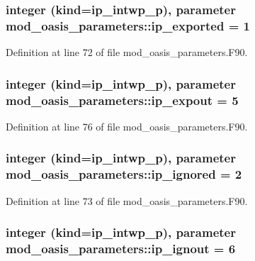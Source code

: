\hypertarget{classmod__oasis__parameters_a0f729cda95773cdc8df800eacdceb606}{
\subsubsection[{ip\+\_\+exported}]{\setlength{\rightskip}{0pt plus 5cm}integer (kind=ip\+\_\+intwp\+\_\+p), parameter mod\+\_\+oasis\+\_\+parameters\+::ip\+\_\+exported = 1}}\label{classmod__oasis__parameters_a0f729cda95773cdc8df800eacdceb606}


Definition at line 72 of file mod\+\_\+oasis\+\_\+parameters.\+F90.

\hypertarget{classmod__oasis__parameters_ae91d5161b091e1f07e6ee64a38514df6}{
\subsubsection[{ip\+\_\+expout}]{\setlength{\rightskip}{0pt plus 5cm}integer (kind=ip\+\_\+intwp\+\_\+p), parameter mod\+\_\+oasis\+\_\+parameters\+::ip\+\_\+expout = 5}}\label{classmod__oasis__parameters_ae91d5161b091e1f07e6ee64a38514df6}


Definition at line 76 of file mod\+\_\+oasis\+\_\+parameters.\+F90.

\hypertarget{classmod__oasis__parameters_ae3733a399c07b165b5ad19543ca1d2a2}{
\subsubsection[{ip\+\_\+ignored}]{\setlength{\rightskip}{0pt plus 5cm}integer (kind=ip\+\_\+intwp\+\_\+p), parameter mod\+\_\+oasis\+\_\+parameters\+::ip\+\_\+ignored = 2}}\label{classmod__oasis__parameters_ae3733a399c07b165b5ad19543ca1d2a2}


Definition at line 73 of file mod\+\_\+oasis\+\_\+parameters.\+F90.

\hypertarget{classmod__oasis__parameters_a4d283e27ebb49e8d97a35842f10d9aec}{
\subsubsection[{ip\+\_\+ignout}]{\setlength{\rightskip}{0pt plus 5cm}integer (kind=ip\+\_\+intwp\+\_\+p), parameter mod\+\_\+oasis\+\_\+parameters\+::ip\+\_\+ignout = 6}}\label{classmod__oasis__parameters_a4d283e27ebb49e8d97a35842f10d9aec}



